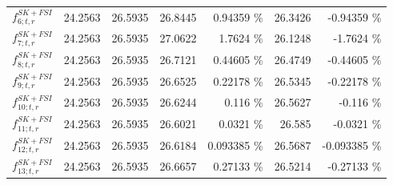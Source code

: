 \begin{table}
\begin{tabular}{| l | r | r | r  r | r  r |}
                                                          $f_{6; t, r}^{SK+FSI}$ &         24.2563 & 26.5935 & 26.8445 &         0.94359 \%  &         26.3426 &        -0.94359 \%  \\ 
                                                          $f_{7; t, r}^{SK+FSI}$ &         24.2563 & 26.5935 & 27.0622 &          1.7624 \%  &         26.1248 &         -1.7624 \%  \\ 
                                                          $f_{8; t, r}^{SK+FSI}$ &         24.2563 & 26.5935 & 26.7121 &         0.44605 \%  &         26.4749 &        -0.44605 \%  \\ 
                                                          $f_{9; t, r}^{SK+FSI}$ &         24.2563 & 26.5935 & 26.6525 &         0.22178 \%  &         26.5345 &        -0.22178 \%  \\ 
                                                         $f_{10; t, r}^{SK+FSI}$ &         24.2563 & 26.5935 & 26.6244 &           0.116 \%  &         26.5627 &          -0.116 \%  \\ 
                                                         $f_{11; t, r}^{SK+FSI}$ &         24.2563 & 26.5935 & 26.6021 &          0.0321 \%  &          26.585 &         -0.0321 \%  \\ 
                                                         $f_{12; t, r}^{SK+FSI}$ &         24.2563 & 26.5935 & 26.6184 &        0.093385 \%  &         26.5687 &       -0.093385 \%  \\ 
                                                         $f_{13; t, r}^{SK+FSI}$ &         24.2563 & 26.5935 & 26.6657 &         0.27133 \%  &         26.5214 &        -0.27133 \%  \\ 

\end{tabular}
\end{table}
